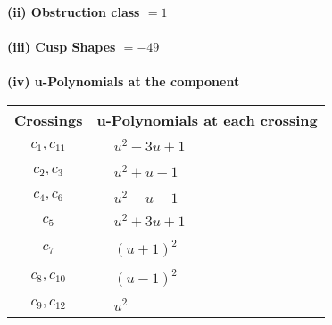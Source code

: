 \documentclass[1p]{elsarticle_modified}
\theoremstyle{definition}
\begin{document}
\flushleft \textbf{(ii) Obstruction class $= 1$}\\~\\
\flushleft \textbf{(iii) Cusp Shapes $= -49$}\\~\\
\newpage\renewcommand{\arraystretch}{1}
\flushleft \textbf{(iv) u-Polynomials at the component}\newline \\
\begin{tabular}{m{50pt}|m{274pt}}
Crossings & \hspace{64pt}u-Polynomials at each crossing \\
\hline $$\begin{aligned}c_{1},c_{11}\end{aligned}$$&$\begin{aligned}
&u^2-3 u+1
\end{aligned}$\\
\hline $$\begin{aligned}c_{2},c_{3}\end{aligned}$$&$\begin{aligned}
&u^2+u-1
\end{aligned}$\\
\hline $$\begin{aligned}c_{4},c_{6}\end{aligned}$$&$\begin{aligned}
&u^2- u-1
\end{aligned}$\\
\hline $$\begin{aligned}c_{5}\end{aligned}$$&$\begin{aligned}
&u^2+3 u+1
\end{aligned}$\\
\hline $$\begin{aligned}c_{7}\end{aligned}$$&$\begin{aligned}
&(u+1)^2
\end{aligned}$\\
\hline $$\begin{aligned}c_{8},c_{10}\end{aligned}$$&$\begin{aligned}
&(u-1)^2
\end{aligned}$\\
\hline $$\begin{aligned}c_{9},c_{12}\end{aligned}$$&$\begin{aligned}
&u^2
\end{aligned}$\\
\hline
\end{tabular}\\~\\
\end{document}
